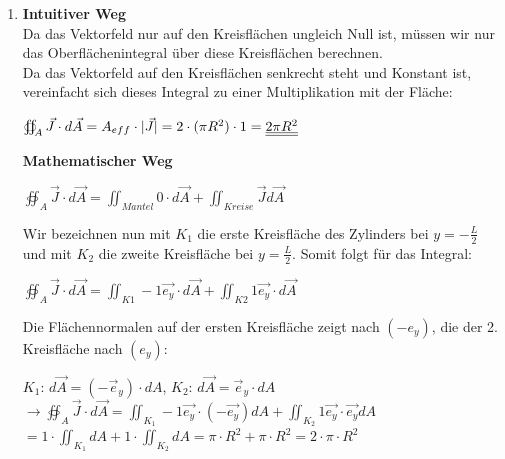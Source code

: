 \begin{enumerate}
\begin{center}
			\end{center}
	\item \textbf{Intuitiver Weg} \\
	Da das Vektorfeld nur auf den Kreisflächen ungleich Null ist, müssen wir nur das Oberflächenintegral über diese Kreisflächen berechnen. \\
	Da das Vektorfeld auf den Kreisflächen senkrecht steht und Konstant ist, vereinfacht sich dieses Integral zu einer Multiplikation mit der Fläche: \\
	\begin{center}
			$\oiint_A \vec{J} \cdot d\vec{A} = A_{eff} \cdot |\vec{J}| = 2 \cdot (\pi R^2) \cdot 1 =  \underline{\underline{2\pi R^2}}$
	\end{center}



	\textbf{Mathematischer Weg} \\ \begin{center}
		$\oiint_A \vec{J} \cdot d\vec{A} = \iint_{Mantel} 0 \cdot d\vec{A} + \iint_{Kreise} \vec{J} d\vec{A}$ \\
	\end{center}

		Wir bezeichnen nun mit $K_1$ die erste Kreisfläche des Zylinders bei $y = - \frac{L}{2}$ und mit $K_2$ die zweite Kreisfläche bei $y = \frac{L}{2}$. Somit folgt für das Integral:
		\begin{center}
		$\oiint_A \vec{J} \cdot d\vec{A} =  \iint_{K1} -1 \vec{e_y} \cdot  d\vec{A} + \iint_{K2} 1 \vec{e_y} \cdot d\vec{A}$
	\end{center}
	Die Flächennormalen auf der ersten Kreisfläche zeigt nach $(-e_y)$, die der 2. Kreisfläche nach $(e_y)$:
	\begin{center}
		$K_1$: $ d\vec{A} = (-\vec{e}_y) \cdot dA$, $K_2$: $ d\vec{A} = \vec{e}_y \cdot dA$ \\
		$ \rightarrow  \oiint_A \vec{J} \cdot d\vec{A} =  \iint_{K_1} -1 \vec{e_y} \cdot (- \vec{e_y})  dA + \iint_{K_2} 1 \vec{e_y} \cdot \vec{e_y} dA $ \\
		$ = 1\cdot \iint_{K_1} dA + 1\cdot \iint_{K_2} dA = \pi\cdot R^2 + \pi\cdot R^2 = 2 \cdot \pi\cdot R^2$

	\end{center}

\end{enumerate}

\iend
